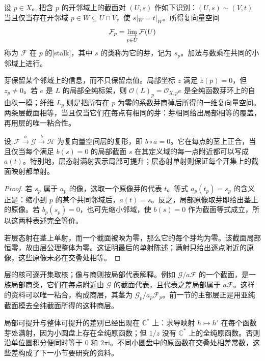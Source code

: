 \begin{definition}
\label{g4:def:0302:stalk}
设 \(p\in X\)。把含 \(p\) 的开邻域上的截面对 \((U,s)\) 作如下识别：\((U,s)\sim(V,t)\) 当且仅当存在开邻域 \(p\in W\subseteq U\cap V\)，使 \(s|_W=t|_W\)。所得复向量空间
\[
 \mathcal F_p=\varinjlim_{p\in U}\mathcal F(U)
\]
称为 \(\mathcal F\) 在 \(p\) 的[stalk]，其中 \(s\) 的类称为它的芽，记为 \(s_p\)。加法与数乘在共同的小邻域上进行。
\end{definition}

芽保留某个邻域上的信息，而不只保留点值。局部坐标 \(z\) 满足 \(z(p)=0\)，但 \(z_p\ne0\)。若 \(e\) 是 \(L\) 的局部全纯标架，则 \(\mathcal O(L)_p=\mathcal O_{X,p}e\) 是全纯函数芽环上的自由秩一模；纤维 \(L_p\) 则是把所有在 \(p\) 为零的系数芽商掉后所得的一维复向量空间。两条层截面相等，当且仅当它们在每点有相同的芽：芽相同给出局部相等的覆盖，再用层的唯一粘合性。

\begin{proposition}
\label{g4:prop:0302:stalk-exactness}
设 \(\mathcal F\xrightarrow{a}\mathcal G\xrightarrow{b}\mathcal H\) 为复向量空间层的复形，即 \(b\circ a=0\)。它在每点的茎上正合，当且仅当每个满足 \(b(s)=0\) 的局部截面 \(s\) 在其定义域的每一点附近都可以写成 \(a(t)\)。特别地，层态射满射表示局部可提升；层态射单射则保证每个开集上的截面映射都单射。
\end{proposition}
\begin{proof}
若 \(s_p\) 属于 \(a_p\) 的像，选取一个原像芽的代表 \(t\)。等式 \(a_p(t_p)=s_p\) 的含义正是：缩小到 \(p\) 的某个共同邻域后，\(a(t)=s\)。反之，局部原像取芽即给出茎上的原像。若 \(b_p(s_p)=0\)，也可先缩小邻域，使 \(b(s)=0\) 作为截面等式成立，所以这两种表述完全等价。

若层态射在茎上单射，而一个截面被映为零，那么它的每个芽均为零。该截面局部恒零，故由层公理整体为零。这证明最后的单射陈述；满射只给出逐点附近的原像，这些原像未必在交叠处相等。
\end{proof}

层的核可逐开集取核；像与商则按局部代表解释。例如 \(\mathcal G/a\mathcal F\) 的一个截面，是一族局部商类，它们在每点附近由 \(\mathcal G\) 的截面代表，且代表之差局部属于 \(a\mathcal F\)。这样的资料可以唯一粘合，构成商层，其茎为 \(\mathcal G_p/a_p\mathcal F_p\)。前一节的主部层正是用亚纯截面模去全纯截面所得的这种商层。

\ProseParagraphBreak

局部可提升与整体可提升的差别已经出现在 \(\mathbb C^*\) 上：求导映射 \(h\mapsto h'\) 在每个函数芽处满射，因为小圆盘上存在全纯原函数；但 \(1/z\) 没有 \(\mathbb C^*\) 上的全纯原函数。否则沿单位圆积分便同时等于 \(0\) 和 \(2\pi\mathrm{i}\)。不同小圆盘中的原函数在交叠处相差常数，这些差构成了下一小节要研究的资料。

